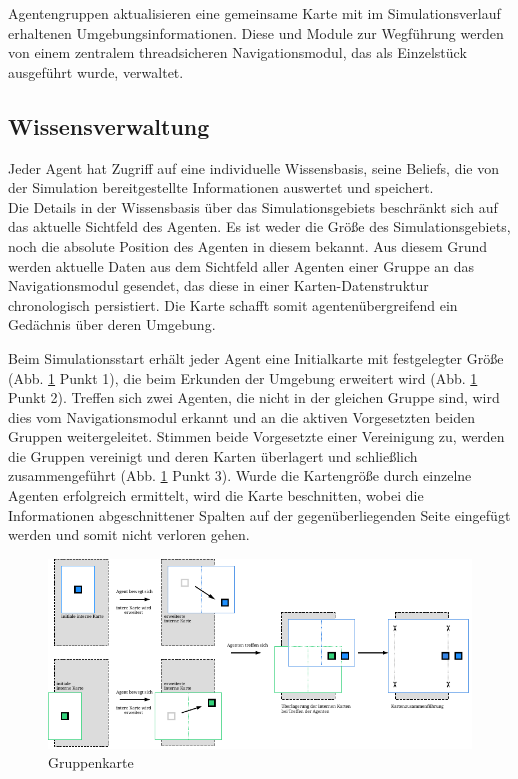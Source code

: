 \documentclass[runningheads]{llncs}
\begin{document}
Agentengruppen aktualisieren eine gemeinsame Karte mit im Simulationsverlauf erhaltenen Umgebungsinformationen. Diese und Module zur Wegführung werden von einem zentralem threadsicheren Navigationsmodul, das als Einzelstück ausgeführt wurde, verwaltet. 


\subsection{Wissensverwaltung}\label{wissensverwaltung}
Jeder Agent hat Zugriff auf eine individuelle Wissensbasis, seine Beliefs, die von der Simulation bereitgestellte Informationen auswertet und speichert. \\
Die Details in der Wissensbasis über das Simulationsgebiets beschränkt sich auf das aktuelle Sichtfeld des Agenten. Es ist weder die Größe des Simulationsgebiets, noch die absolute Position des Agenten in diesem bekannt. 
Aus diesem Grund werden aktuelle Daten aus dem Sichtfeld aller Agenten einer Gruppe an das Navigationsmodul gesendet, das diese in einer Karten-Datenstruktur chronologisch persistiert. Die Karte schafft somit agentenübergreifend ein Gedächnis über deren Umgebung.

Beim Simulationsstart erhält jeder Agent eine Initialkarte mit festgelegter Größe (Abb. \ref{Karte} Punkt 1), die beim Erkunden der Umgebung erweitert wird (Abb. \ref{Karte} Punkt 2). Treffen sich zwei Agenten, die nicht in der gleichen Gruppe sind, wird dies vom Navigationsmodul erkannt und an die aktiven Vorgesetzten beiden Gruppen weitergeleitet. Stimmen beide Vorgesetzte einer Vereinigung zu, werden die Gruppen vereinigt und deren Karten überlagert und schließlich zusammengeführt (Abb. \ref{Karte} Punkt 3). Wurde die Kartengröße durch einzelne Agenten erfolgreich ermittelt, wird die Karte beschnitten, wobei die Informationen abgeschnittener Spalten auf der gegenüberliegenden Seite eingefügt werden und somit nicht verloren gehen.
\begin{figure}[h]
\includegraphics{./Referenzen/Kartenmerge.pdf}
\caption{Gruppenkarte}
\label{Karte}
\end{figure}
\end{document}
